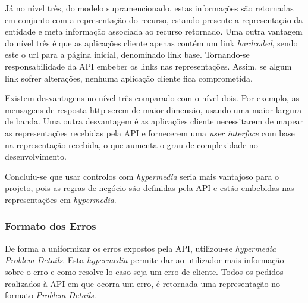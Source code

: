 Já no nível três, do modelo supramencionado, estas informações são retornadas em conjunto com a representação do recurso, estando presente a representação da entidade e meta informação associada ao recurso retornado. Uma outra vantagem do nível três é que as aplicações cliente apenas contém um link \textit{hardcoded}, sendo este o url para a página inicial, denominado link base. Tornando-se responsabilidade da API embeber os links nas representações. Assim, se algum link sofrer alterações, nenhuma aplicação cliente fica comprometida.

Existem desvantagens no nível três comparado com o nível dois. Por exemplo, as mensagens de resposta \acrshort{http} serem de maior dimensão, usando uma maior largura de banda. Uma outra desvantagem é as aplicações cliente necessitarem de mapear as representações recebidas pela API e fornecerem uma \textit{user interface} com base na representação recebida, o que aumenta o grau de complexidade no desenvolvimento.

Concluiu-se que usar controlos com \textit{hypermedia} seria mais vantajoso para o projeto, pois as regras de negócio são definidas pela API e estão embebidas nas representações em \textit{hypermedia}.\\

\noindent{}

\subsubsection{Formato dos Erros}
De forma a uniformizar os erros expostos pela API, utilizou-se \textit{hypermedia} \textit{Problem Details}. Esta \textit{hypermedia} permite dar ao utilizador mais informação sobre o erro e como resolve-lo caso seja um erro de cliente. Todos os pedidos realizados à API em que ocorra um erro, é retornada uma representação no formato \textit{Problem Details}.


